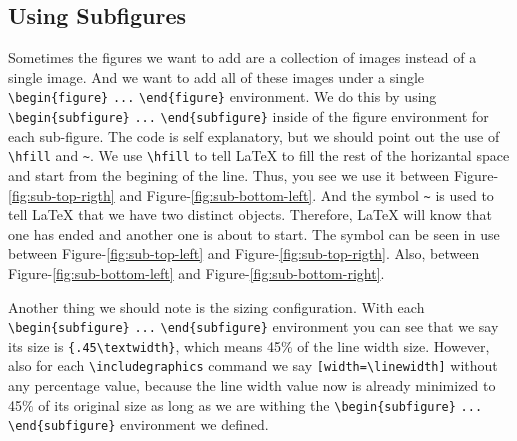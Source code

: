 \subsection{Using Subfigures}

Sometimes the figures we want to add are a collection of images instead of a single image. And we want to add all of these images under a single \verb|\begin{figure}| \verb|...| \verb|\end{figure}| environment. We do this by using \verb|\begin{subfigure}| \verb|...| \verb|\end{subfigure}| inside of the figure environment for each sub-figure. The code is self explanatory, but we should point out the use of \verb|\hfill| and \verb|~|. We use \verb|\hfill| to tell {\LaTeX} to fill the rest of the horizantal space and start from the begining of the line. Thus, you see we use it between Figure-\ref{fig:sub-top-rigth} and Figure-\ref{fig:sub-bottom-left}. And the symbol \verb|~| is used to tell {\LaTeX} that we have two distinct objects. Therefore, {\LaTeX} will know that one has ended and another one is about to start. The symbol can be seen in use between Figure-\ref{fig:sub-top-left} and Figure-\ref{fig:sub-top-rigth}. Also, between Figure-\ref{fig:sub-bottom-left} and Figure-\ref{fig:sub-bottom-right}. 

Another thing we should note is the sizing configuration. With each \verb|\begin{subfigure}| \verb|...| \verb|\end{subfigure}| environment you can see that we say its size is \verb|{.45\textwidth}|, which means 45\% of the line width size. However, also for each \verb|\includegraphics| command we say \verb|[width=\linewidth]| without any percentage value, because the line width value now is already minimized to 45\% of its original size as long as we are withing the \verb|\begin{subfigure}| \verb|...| \verb|\end{subfigure}| environment we defined. 

